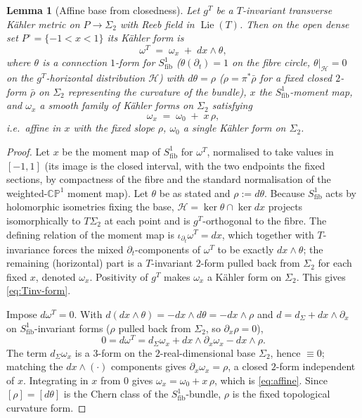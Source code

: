 \documentclass{amsart}
\newtheorem{lemma}{Lemma}
\theoremstyle{definition}
\DeclareMathOperator{\Lie}{Lie}
\begin{document}
\begin{lemma}[Affine base from closedness]\label{lem:affine}
Let $g^T$ be a $T$-invariant transverse K\"ahler metric on $P\to\Sigma_2$ with
Reeb field in $\Lie(T)$. Then on the open dense set $P^\circ=\{-1<x<1\}$ its
K\"ahler form is
\begin{equation}\label{eq:Tinv-form}
  \omega^T \;=\; \omega_x \;+\; dx\wedge\theta ,
\end{equation}
where $\theta$ is a connection $1$-form for $S^1_{\mathrm{fib}}$
($\theta(\partial_t)=1$ on the fibre circle, $\theta|_{\mathcal H}=0$ on the
$g^T$-horizontal distribution $\mathcal H$) with $d\theta=\rho$
($\rho=\pi^*\bar\rho$ for a fixed closed $2$-form $\bar\rho$ on $\Sigma_2$
representing the curvature of the bundle), $x$ the $S^1_{\mathrm{fib}}$-moment
map, and $\omega_x$ a smooth family of K\"ahler forms on $\Sigma_2$ satisfying
\begin{equation}\label{eq:affine}
  \omega_x \;=\; \omega_{0} \;+\; x\,\rho ,
\end{equation}
i.e.\ \emph{affine in $x$ with the fixed slope $\rho$}, $\omega_0$ a single
K\"ahler form on $\Sigma_2$.
\end{lemma}

\begin{proof}
Let $x$ be the moment map of $S^1_{\mathrm{fib}}$ for $\omega^T$, normalised to
take values in $[-1,1]$ (its image is the closed interval, with the two
endpoints the fixed sections, by compactness of the fibre and the standard
normalisation of the weighted-$\mathbb{CP}^1$ moment map). Let $\theta$ be as
stated and $\rho:=d\theta$. Because $S^1_{\mathrm{fib}}$ acts by holomorphic
isometries fixing the base, $\mathcal H=\ker\theta\cap\ker dx$ projects
isomorphically to $T\Sigma_2$ at each point and is $g^T$-orthogonal to the
fibre. The defining relation of the moment map is
$\iota_{\partial_t}\omega^T=dx$, which together with $T$-invariance forces the
mixed $\partial_t$-components of $\omega^T$ to be exactly $dx\wedge\theta$; the
remaining (horizontal) part is a $T$-invariant $2$-form pulled back from
$\Sigma_2$ for each fixed $x$, denoted $\omega_x$. Positivity of $g^T$ makes
$\omega_x$ a K\"ahler form on $\Sigma_2$. This gives \eqref{eq:Tinv-form}.

Impose $d\omega^T=0$. With $d(dx\wedge\theta)=-dx\wedge d\theta=-dx\wedge\rho$
and $d=d_{\Sigma}+dx\wedge\partial_x$ on $S^1_{\mathrm{fib}}$-invariant forms
($\rho$ pulled back from $\Sigma_2$, so $\partial_x\rho=0$),
\[
  0=d\omega^T = d_\Sigma\omega_x + dx\wedge\partial_x\omega_x - dx\wedge\rho .
\]
The term $d_\Sigma\omega_x$ is a $3$-form on the $2$-real-dimensional base
$\Sigma_2$, hence $\equiv0$; matching the $dx\wedge(\cdot)$ components gives
$\partial_x\omega_x=\rho$, a closed $2$-form independent of $x$. Integrating in
$x$ from $0$ gives $\omega_x=\omega_0+x\,\rho$, which is \eqref{eq:affine}. Since
$[\rho]=[d\theta]$ is the Chern class of the $S^1_{\mathrm{fib}}$-bundle, $\rho$
is the fixed topological curvature form.
\end{proof}
\end{document}
